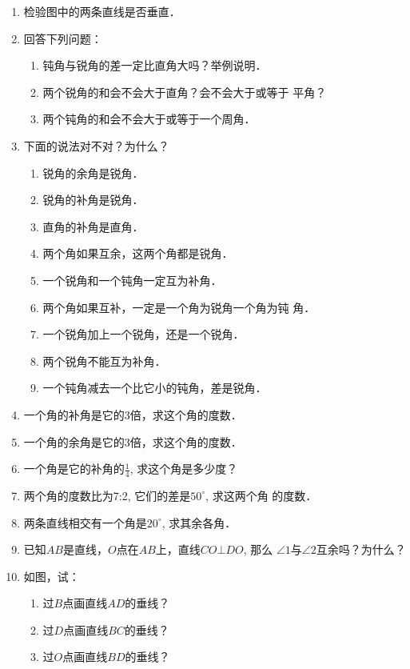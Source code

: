 \begin{enumerate}
\item 检验图中的两条直线是否垂直．
\item 回答下列问题：
\begin{enumerate}
\item 钝角与锐角的差一定比直角大吗？举例说明．
\item 两个锐角的和会不会大于直角？会不会大于或等于
平角？
\item 两个钝角的和会不会大于或等于一个周角．
\end{enumerate}

\item 下面的说法对不对？为什么？
\begin{enumerate}
\item 锐角的余角是锐角．
\item 锐角的补角是锐角．
\item 直角的补角是直角．
\item 两个角如果互余，这两个角都是锐角．
\item 一个锐角和一个钝角一定互为补角．
\item 两个角如果互补，一定是一个角为锐角一个角为钝
角．
\item 一个锐角加上一个锐角，还是一个锐角．
\item 两个锐角不能互为补角．
\item 一个钝角减去一个比它小的钝角，差是锐角．
\end{enumerate}

\item 一个角的补角是它的3倍，求这个角的度数．
\item 一个角的余角是它的3倍，求这个角的度数．
\item 一个角是它的补角的$\frac{1}{4}$, 求这个角是多少度？
\item 两个角的度数比为7:2, 它们的差是$50^{\circ}$, 求这两个角
的度数．
\item 两条直线相交有一个角是$20^{\circ}$, 求其余各角．
\item 已知$AB$是直线，$O$点在$AB$上，直线$CO\bot DO$, 那么
$\angle 1$与$\angle 2$互余吗？为什么？
\item 如图，试：
\begin{enumerate}
\item 过$B$点画直线$AD$的垂线？
\item 过$D$点画直线$BC$的垂线？
\item 过$O$点画直线$BD$的垂线？
\end{enumerate}


\end{enumerate}

